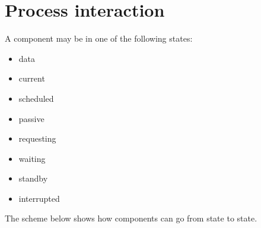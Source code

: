 \documentclass[letterpaper,10pt,english]{sphinxmanual}
\begin{document}
\section{Process interaction}
\label{\detokenize{Component:process-interaction}}
A component may be in one of the following states:
\begin{itemize}
\item {} 
data

\item {} 
current

\item {} 
scheduled

\item {} 
passive

\item {} 
requesting

\item {} 
waiting

\item {} 
standby

\item {} 
interrupted

\end{itemize}

The scheme below shows how components can go from state to state.
\end{document}
